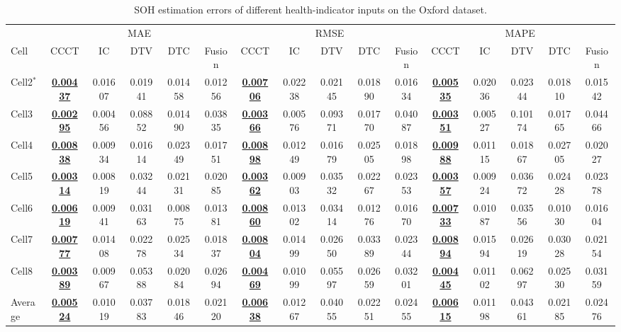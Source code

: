 \begin{table}[!htb]
\TableStyle
\fontsize{7pt}{9pt}\selectfont
\setlength{\tabcolsep}{0.8pt}
\renewcommand{\arraystretch}{1.18}
\caption{SOH estimation errors of different health-indicator inputs on the Oxford dataset.}
\label{tab:4-hi-input}
\begin{tabular*}{\linewidth}{@{\extracolsep{\fill}}l*{15}{c}@{}}
\toprule
& \multicolumn{5}{c}{MAE}
& \multicolumn{5}{c}{RMSE}
& \multicolumn{5}{c}{MAPE} \\
\cmidrule(lr){2-6}\cmidrule(lr){7-11}\cmidrule(lr){12-16}
Cell
& CCCT & IC & DTV & DTC & Fusion
& CCCT & IC & DTV & DTC & Fusion
& CCCT & IC & DTV & DTC & Fusion \\
\midrule
Cell2$^{*}$
& \textbf{\underline{0.00437}} & 0.01607 & 0.01941 & 0.01458 & 0.01256
& \textbf{\underline{0.00706}} & 0.02238 & 0.02145 & 0.01890 & 0.01634
& \textbf{\underline{0.00535}} & 0.02036 & 0.02344 & 0.01810 & 0.01542 \\
Cell3
& \textbf{\underline{0.00295}} & 0.00456 & 0.08852 & 0.01490 & 0.03835
& \textbf{\underline{0.00366}} & 0.00576 & 0.09371 & 0.01770 & 0.04087
& \textbf{\underline{0.00351}} & 0.00527 & 0.10174 & 0.01765 & 0.04466 \\
Cell4
& \textbf{\underline{0.00838}} & 0.00934 & 0.01614 & 0.02349 & 0.01751
& \textbf{\underline{0.00898}} & 0.01249 & 0.01679 & 0.02505 & 0.01898
& \textbf{\underline{0.00988}} & 0.01115 & 0.01867 & 0.02705 & 0.02027 \\
Cell5
& \textbf{\underline{0.00314}} & 0.00819 & 0.03244 & 0.02131 & 0.02085
& \textbf{\underline{0.00362}} & 0.00903 & 0.03532 & 0.02267 & 0.02353
& \textbf{\underline{0.00357}} & 0.00924 & 0.03672 & 0.02428 & 0.02378 \\
Cell6
& \textbf{\underline{0.00619}} & 0.00941 & 0.03163 & 0.00875 & 0.01381
& \textbf{\underline{0.00860}} & 0.01302 & 0.03414 & 0.01276 & 0.01670
& \textbf{\underline{0.00733}} & 0.01087 & 0.03556 & 0.01030 & 0.01604 \\
Cell7
& \textbf{\underline{0.00777}} & 0.01408 & 0.02278 & 0.02534 & 0.01837
& \textbf{\underline{0.00804}} & 0.01499 & 0.02650 & 0.03389 & 0.02344
& \textbf{\underline{0.00894}} & 0.01594 & 0.02619 & 0.03028 & 0.02154 \\
Cell8
& \textbf{\underline{0.00389}} & 0.00967 & 0.05388 & 0.02084 & 0.02694
& \textbf{\underline{0.00469}} & 0.01099 & 0.05597 & 0.02659 & 0.03201
& \textbf{\underline{0.00445}} & 0.01102 & 0.06297 & 0.02530 & 0.03159 \\
\addlinespace[2pt]
Average
& \textbf{\underline{0.00524}} & 0.01019 & 0.03783 & 0.01846 & 0.02120
& \textbf{\underline{0.00638}} & 0.01267 & 0.04055 & 0.02251 & 0.02455
& \textbf{\underline{0.00615}} & 0.01198 & 0.04361 & 0.02185 & 0.02476 \\
\bottomrule
\end{tabular*}
\end{table}
